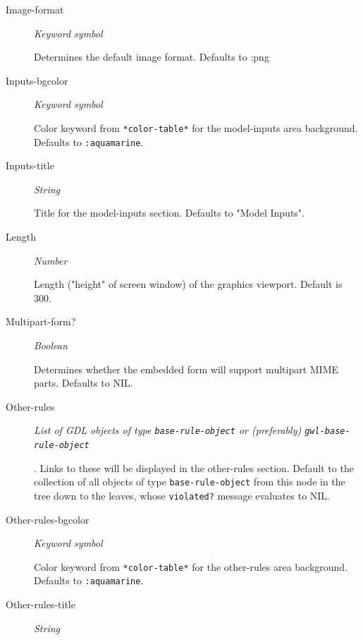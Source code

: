 \documentclass [11pt]{book}
\begin{document}
\begin{itemize}
\begin{description}
\item [Image-format]
\emph{Keyword symbol}

 Determines the default image format. Defaults to :png




\item [Inputs-bgcolor]
\emph{Keyword symbol}

 Color keyword from \texttt{*color-table*} for the model-inputs area background. Defaults to \texttt{:aquamarine}.




\item [Inputs-title]
\emph{String}

 Title for the model-inputs section. Defaults to "Model Inputs".




\item [Length]
\emph{Number}

 Length ("height" of screen window) of the graphics viewport. Default is 300.




\item [Multipart-form?]
\emph{Boolean}

 Determines whether the embedded form will support multipart MIME parts. Defaults to NIL.




\item [Other-rules]
\emph{List of GDL objects of type \texttt{base-rule-object} or (preferably) \texttt{gwl-base-rule-object}}

.
Links to these will be displayed in the other-rules section. Default to the collection of all objects of type
\texttt{base-rule-object} from this node in the tree down to the leaves, whose \texttt{violated?} message
evaluates to NIL.




\item [Other-rules-bgcolor]
\emph{Keyword symbol}

 Color keyword from \texttt{*color-table*} for the other-rules area  background. Defaults to \texttt{:aquamarine}.




\item [Other-rules-title]
\emph{String}


\end{description}
\end{itemize}
\end{document}
